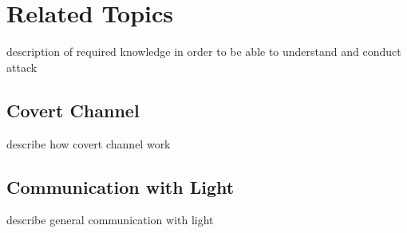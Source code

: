 \section{Related Topics}
\label{sec:related_topics}

description of required knowledge in order to be able to understand and conduct attack

\subsection{Covert Channel}
\label{sec:covert_channel}

describe how covert channel work

\subsection{Communication with Light}
\label{sec:light_communication}

describe general communication with light